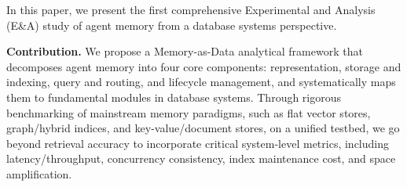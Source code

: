 







In this paper, we present the first comprehensive Experimental and Analysis (E\&A) study of agent memory from a database systems perspective.

\noindent \textbf{Contribution.} We propose a Memory-as-Data analytical framework that decomposes agent memory into four core components: representation, storage and indexing, query and routing, and lifecycle management, and systematically maps them to fundamental modules in database systems. Through rigorous benchmarking of mainstream memory paradigms, such as flat vector stores, graph/hybrid indices, and key-value/document stores, on a unified testbed, we go beyond retrieval accuracy to incorporate critical system-level metrics, including latency/throughput, concurrency consistency, index maintenance cost, and space amplification.

